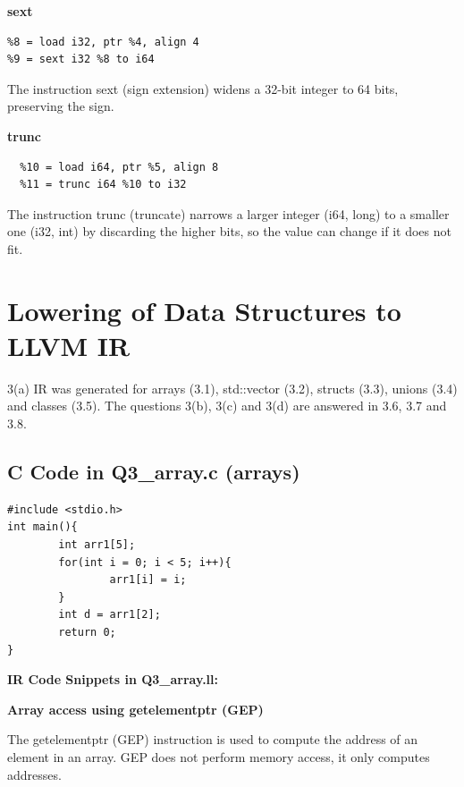 \documentclass[11pt,a4paper]{article}
\begin{document}
\textbf{sext}




\begin{lstlisting}
%8 = load i32, ptr %4, align 4
%9 = sext i32 %8 to i64
\end{lstlisting}

The instruction sext (sign extension) widens a 32-bit integer to 64 bits, preserving the sign.


\textbf{trunc}




\begin{lstlisting}
  %10 = load i64, ptr %5, align 8
  %11 = trunc i64 %10 to i32
\end{lstlisting}

The instruction trunc (truncate) narrows a larger integer (i64, long) to a smaller one (i32, int) by discarding the higher bits, so the value can change if it does not fit.


\clearpage
\section{Lowering of Data Structures to LLVM IR}

3(a) IR was generated for arrays (3.1), std::vector (3.2), structs (3.3), unions (3.4) and classes (3.5). The questions 3(b), 3(c) and 3(d) are answered in 3.6, 3.7 and 3.8.

\subsection{C Code in Q3\_array.c (arrays)}

\begin{lstlisting}
#include <stdio.h>
int main(){
        int arr1[5];
        for(int i = 0; i < 5; i++){
                arr1[i] = i;
        }
        int d = arr1[2];
        return 0;
}
\end{lstlisting}

\medskip\noindent\textbf{IR Code Snippets in Q3\_array.ll:}\par




\textbf{Array access using getelementptr (GEP)}




The getelementptr (GEP) instruction is used to compute the address of an element in an array. GEP does not perform memory access, it only computes addresses. 
\end{document}
